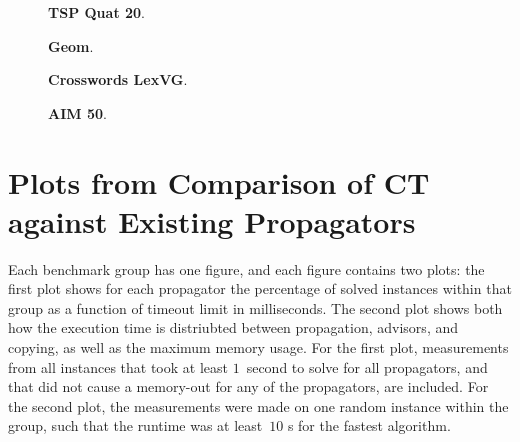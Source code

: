 \documentclass[a4paper,11pt]{article}
\numberwithin{equation}{section}
\begin{document}
\begin{figure}
  \begin{minipage}[b][8cm][s]{0.45\textwidth}
    \centering
    \vfill
    \begin{tikzpicture}[scale=0.8]
      
    \end{tikzpicture}
    \vfill
    \caption{\textbf{TSP Quat 20}.}
    \vspace{\baselineskip}
  \end{minipage}\qquad
  \begin{minipage}[b][8cm][s]{0.45\textwidth}
    \centering
    \vfill
    \begin{tikzpicture}[scale=0.8]
      
    \end{tikzpicture}
    \vfill
    \caption{\textbf{Geom}.}
    \vspace{\baselineskip}
  \end{minipage}\qquad
  \begin{minipage}[b][8cm][s]{0.45\textwidth}
    \centering
    \vfill
    \begin{tikzpicture}[scale=0.8]
      
    \end{tikzpicture}
    \vfill
    \caption{\textbf{Crosswords LexVG}.}
    \vspace{\baselineskip}
  \end{minipage} \qquad
    \begin{minipage}[b][8cm][s]{0.45\textwidth}
    \centering
    \vfill
    \begin{tikzpicture}[scale=0.8]
      
    \end{tikzpicture}
    \vfill
    \caption{\textbf{AIM 50}.}
    \vspace{\baselineskip}
  \end{minipage} \qquad
  
\end{figure}

\clearpage

\section{Plots from Comparison of CT against Existing Propagators}
\label{app:compare-gecode}

Each benchmark group has one figure, and each figure contains two plots:
the first plot shows for each propagator the percentage of solved instances within that group
as a function of timeout limit in milliseconds.
The second plot shows both how the execution time is distriubted between propagation,
advisors, and copying, as well as the maximum memory usage.
For the first plot, measurements from all instances that took at least $1$~second to solve for all
propagators, and that did not cause a memory-out for any of the propagators, are included.
For the second plot, the measurements were made on one random instance within the group, such
that the runtime was at least~$10$ s for the fastest algorithm.
\end{document}
